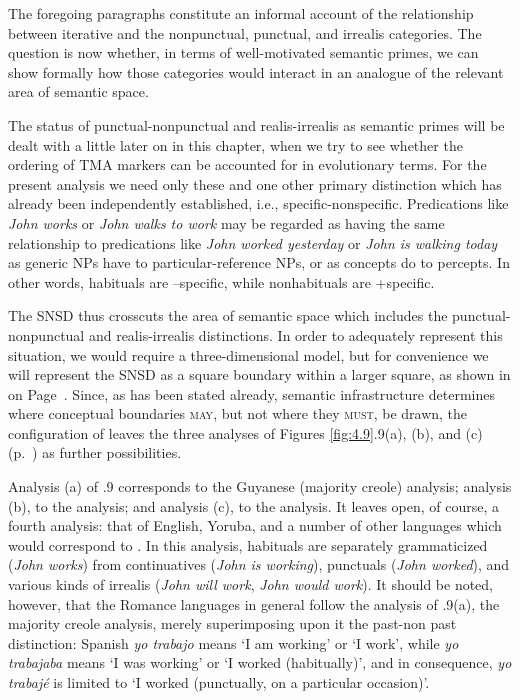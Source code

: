 The foregoing paragraphs constitute an informal account of the relationship between iterative and the nonpunctual, punctual, and irrealis categories. The question is now whether, in terms of well-motivated semantic primes, we can show formally how those categories would interact in an analogue of the relevant area of semantic space.

The status of punc\-tu\-al-nonpunctual and realis-irrealis as semantic primes will be dealt with a little later on in this chapter, when we try to see whether the ordering of TMA markers can be accounted for in evolutionary terms. For the present analysis we need only these and one other primary distinction which has already been independently established, i.e., specific-nonspecific. Predications like  \textit{John works} or
\textit{John walks to work} may be regarded as having the same relationship to predications like \textit{John worked yesterday} or \textit{John is walking today} as generic NPs have to particular-reference NPs, or as concepts do to percepts. In other words, habituals are --specific, while nonhabituals are +specific.

The SNSD thus crosscuts the area of semantic space which includes the punctual-nonpunctual and realis-irrealis distinctions. In order to adequately represent this situation, we would require a three-dimensional model, but for convenience we will represent the SNSD as a square boundary within a larger square, as shown in  on Page~\pageref{fig:4.8}. Since, as has been stated already, semantic infrastructure determines where conceptual boundaries \textsc{may}, but not where they \textsc{must}, be drawn, the configuration of  leaves the three analyses of Figures \ref{fig:4.9}.9(a), (b), and (c) (p.~\pageref{fig:4.9}) as further possibilities.

Analysis (a) of .9 corresponds to the Guyanese (majority creole) analysis; analysis (b), to the  analysis; and analysis (c), to the  analysis. It leaves open, of course, a fourth analysis: that of English, Yoruba, and a number of other languages which would correspond to . In this analysis, habituals are separately grammaticized (\textit{John works}) from continuatives (\textit{John is working}), punctuals (\textit{John worked}), and various kinds of irrealis (\textit{John will work}, \textit{John would work}). It should be noted, however, that the Romance languages in general follow the analysis of .9(a), the majority creole analysis, merely superimposing upon it the past-non past distinction: Spanish \textit{yo  trabajo} means `I am working' or `I work', while \textit{yo trabajaba} means `I was working' or `I worked (habitually)', and in consequence, \textit{yo trabajé} is limited to `I worked (punctually, on a particular occasion)'.\\\\

